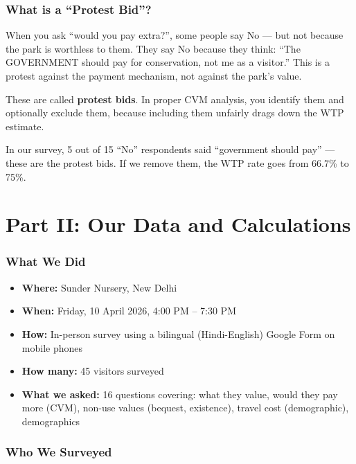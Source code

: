 \documentclass[11pt, a4paper]{article}
\begin{document}
\section{What is a ``Protest Bid''?}

When you ask ``would you pay extra?'', some people say No --- but not because the park is worthless to them. They say No because they think: ``The GOVERNMENT should pay for conservation, not me as a visitor.'' This is a protest against the payment mechanism, not against the park's value.

These are called \textbf{protest bids}. In proper CVM analysis, you identify them and optionally exclude them, because including them unfairly drags down the WTP estimate.

In our survey, 5 out of 15 ``No'' respondents said ``government should pay'' --- these are the protest bids. If we remove them, the WTP rate goes from 66.7\% to 75\%.

\newpage
\part*{Part II: Our Data and Calculations}

\section{What We Did}

\begin{itemize}[nosep]
    \item \textbf{Where:} Sunder Nursery, New Delhi
    \item \textbf{When:} Friday, 10 April 2026, 4:00 PM -- 7:30 PM
    \item \textbf{How:} In-person survey using a bilingual (Hindi-English) Google Form on mobile phones
    \item \textbf{How many:} 45 visitors surveyed
    \item \textbf{What we asked:} 16 questions covering: what they value, would they pay more (CVM), non-use values (bequest, existence), travel cost (demographic), demographics
\end{itemize}

\section{Who We Surveyed}
\end{document}
